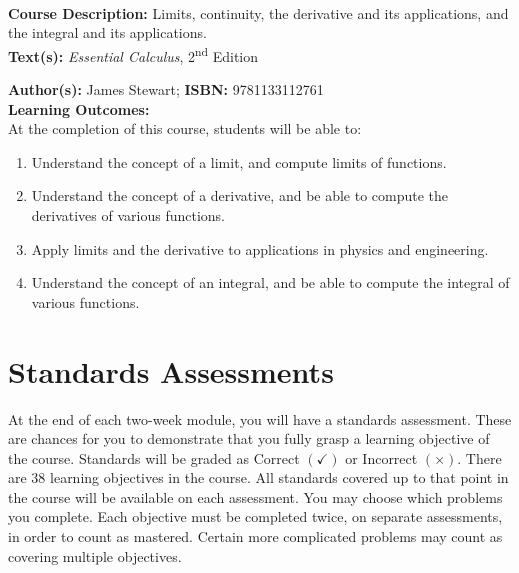 \documentclass[11pt]{article}
\begin{document}
\textbf {\large \\ Course Description:} Limits, continuity, the derivative and its applications, and the integral and its applications.  \\

\textbf {\large Text(s):} \emph{Essential Calculus}, 2\textsuperscript{nd} Edition

\textbf {Author(s):} James Stewart;  \textbf {ISBN:} 9781133112761 \\

\textbf {\large Learning Outcomes:} \\
At the completion of this course, students will be able to:
\begin{enumerate} \itemsep-0.4em
  \item Understand the concept of a limit, and compute limits of functions.
  \item Understand the concept of a derivative, and be able to compute the derivatives of various functions.
  \item Apply limits and the derivative to applications in physics and engineering.
  \item Understand the concept of an integral, and be able to compute the integral of various functions.
\end{enumerate}

\section*{Standards Assessments}
At the end of each two-week module, you will have a standards assessment. These are chances for you to demonstrate that you fully grasp a learning objective of the course. Standards will be graded as Correct $(\checkmark)$ or Incorrect $(\times)$. There are 38 learning objectives in the course. All standards covered up to that point in the course will be available on each assessment. You may choose which problems you complete. Each objective must be completed twice, on separate assessments, in order to count as mastered. Certain more complicated problems may count as covering multiple objectives.


\newpage
\end{document}

